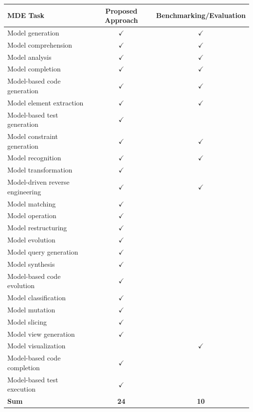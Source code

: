 \begin{tabular} { l c c } \\ 
\toprule 
MDE Task & Proposed Approach & Benchmarking/Evaluation\\ 
\midrule 
Model generation & $\checkmark$ & $\checkmark$\\ 
Model comprehension & $\checkmark$ & $\checkmark$\\ 
Model analysis & $\checkmark$ & $\checkmark$\\ 
Model completion & $\checkmark$ & $\checkmark$\\ 
Model-based code generation & $\checkmark$ & $\checkmark$\\ 
Model element extraction & $\checkmark$ & $\checkmark$\\ 
Model-based test generation & $\checkmark$ & \\ 
Model constraint generation & $\checkmark$ & $\checkmark$\\ 
Model recognition & $\checkmark$ & $\checkmark$\\ 
Model transformation & $\checkmark$ & \\ 
Model-driven reverse engineering & $\checkmark$ & $\checkmark$\\ 
Model matching & $\checkmark$ & \\ 
Model operation & $\checkmark$ & \\ 
Model restructuring & $\checkmark$ & \\ 
Model evolution & $\checkmark$ & \\ 
Model query generation & $\checkmark$ & \\ 
Model synthesis & $\checkmark$ & \\ 
Model-based code evolution & $\checkmark$ & \\ 
Model classification & $\checkmark$ & \\ 
Model mutation & $\checkmark$ & \\ 
Model slicing & $\checkmark$ & \\ 
Model view generation & $\checkmark$ & \\ 
Model visualization &  & $\checkmark$\\ 
Model-based code completion & $\checkmark$ & \\ 
Model-based test execution & $\checkmark$ & \\ 
\midrule 
\textbf{Sum} & \textbf{24} & \textbf{10}\\ 
\bottomrule 
\end{tabular} 
